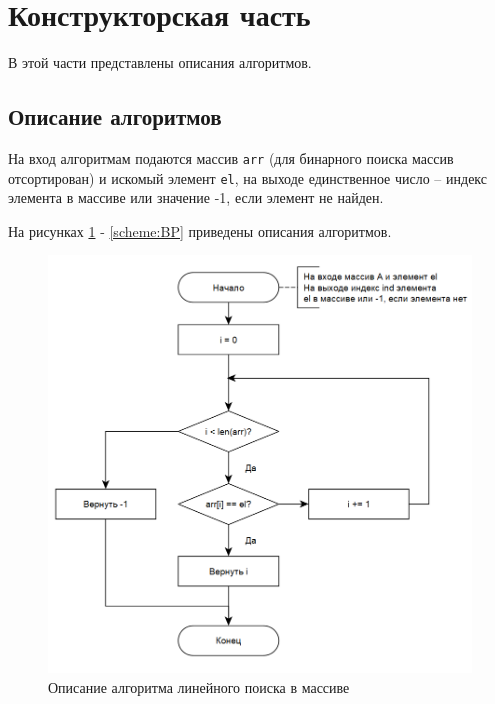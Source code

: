 \documentclass{article}
\begin{document}
\clearpage\section{Конструкторская часть}
В этой части представлены описания алгоритмов.

\subsection{Описание алгоритмов}
На вход алгоритмам подаются массив \texttt{arr} (для бинарного поиска массив отсортирован) и искомый элемент \texttt{el}, на 
выходе единственное число -- индекс элемента в массиве или значение -1, если элемент не найден.

На рисунках \ref{scheme:LP} - \ref{scheme:BP} приведены описания алгоритмов.
	
\begin{figure}[h]
	\centering
	\includegraphics[scale=0.8]{tools/alg_1.png}
	\caption{Описание алгоритма линейного поиска в массиве}
	\label{scheme:LP}
\end{figure}
\end{document}
